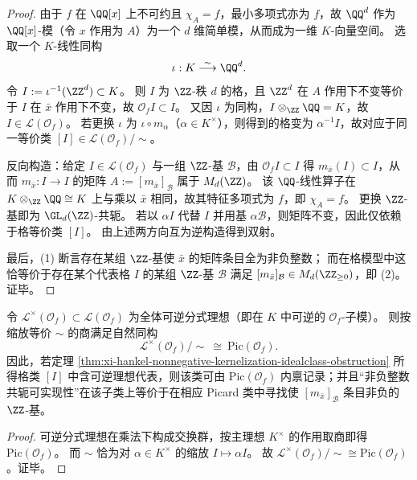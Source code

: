 \begin{proof}
由于 \(f\) 在 \(\QQ[x]\) 上不可约且 \(\chi_A=f\)，最小多项式亦为 \(f\)，故 \(\QQ^d\) 作为 \(\QQ[x]\)-模（令 \(x\) 作用为 \(A\)）为一个 \(d\) 维简单模，从而成为一维 \(K\)-向量空间。
选取一个 \(K\)-线性同构
\[
\iota:K\stackrel{\sim}{\longrightarrow}\QQ^d.
\]
令 \(I:=\iota^{-1}(\ZZ^d)\subset K\)。
则 \(I\) 为 \(\ZZ\)-秩 \(d\) 的格，且 \(\ZZ^d\) 在 \(A\) 作用下不变等价于 \(I\) 在 \(\bar x\) 作用下不变，故 \(\mathcal O_f I\subset I\)。
又因 \(\iota\) 为同构，\(I\otimes_{\ZZ}\QQ=K\)，故 \(I\in\mathscr L(\mathcal O_f)\)。
若更换 \(\iota\) 为 \(\iota\circ m_\alpha\)（\(\alpha\in K^\times\)），则得到的格变为 \(\alpha^{-1}I\)，故对应于同一等价类 \([I]\in\mathscr L(\mathcal O_f)/\sim\)。
\par
反向构造：给定 \(I\in\mathscr L(\mathcal O_f)\) 与一组 \(\ZZ\)-基 \(\mathcal B\)，由 \(\mathcal O_f I\subset I\) 得 \(m_{\bar x}(I)\subset I\)，从而 \(m_{\bar x}:I\to I\) 的矩阵
\(
A:=[m_{\bar x}]_{\mathcal B}
\)
属于 \(M_d(\ZZ)\)。
该 \(\QQ\)-线性算子在 \(K\otimes_{\ZZ}\QQ\cong K\) 上与乘以 \(\bar x\) 相同，故其特征多项式为 \(f\)，即 \(\chi_A=f\)。
更换 \(\ZZ\)-基即为 \(\GL_d(\ZZ)\)-共轭。
若以 \(\alpha I\) 代替 \(I\) 并用基 \(\alpha\mathcal B\)，则矩阵不变，因此仅依赖于格等价类 \([I]\)。
由上述两方向互为逆构造得到双射。
\par
最后，(1) 断言存在某组 \(\ZZ\)-基使 \(\bar x\) 的矩阵条目全为非负整数；
而在格模型中这恰等价于存在某个代表格 \(I\) 的某组 \(\ZZ\)-基 \(\mathcal B\) 满足 \([m_{\bar x}]_{\mathcal B}\in M_d(\ZZ_{\ge 0})\)，即 (2)。
证毕。
\end{proof}

\begin{corollary}\label{cor:xi-hankel-invertible-ideal-subclass-pic}
令 \(\mathscr L^\times(\mathcal O_f)\subset \mathscr L(\mathcal O_f)\) 为全体可逆分式理想（即在 \(K\) 中可逆的 \(\mathcal O_f\)-子模）。
则按缩放等价 \(\sim\) 的商满足自然同构
\[
\mathscr L^\times(\mathcal O_f)/\sim\ \cong\ \mathrm{Pic}(\mathcal O_f).
\]
因此，若定理 \ref{thm:xi-hankel-nonnegative-kernelization-idealclass-obstruction} 所得格类 \([I]\) 中含可逆理想代表，则该类可由 \(\mathrm{Pic}(\mathcal O_f)\) 内禀记录；并且“非负整数共轭可实现性”在该子类上等价于在相应 Picard 类中寻找使 \([m_{\bar x}]_{\mathcal B}\) 条目非负的 \(\ZZ\)-基。
\end{corollary}
\begin{proof}
可逆分式理想在乘法下构成交换群，按主理想 \(K^\times\) 的作用取商即得 \(\mathrm{Pic}(\mathcal O_f)\)。
而 \(\sim\) 恰为对 \(\alpha\in K^\times\) 的缩放 \(I\mapsto \alpha I\)。
故 \(\mathscr L^\times(\mathcal O_f)/\sim\cong \mathrm{Pic}(\mathcal O_f)\)。证毕。
\end{proof}

